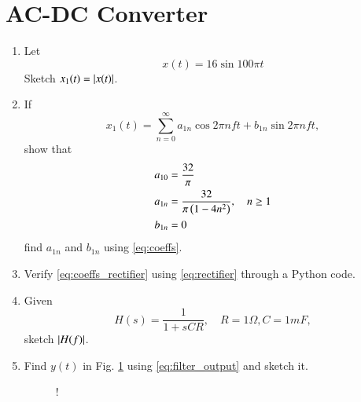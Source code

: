 \documentclass[journal,12pt,twocolumn]{IEEEtran}
\renewcommand\thesection{\arabic{section}}
\begin{document}
\section{AC-DC Converter}
\begin{enumerate}[label=\thesection.\arabic*
,ref=\thesection.\theenumi]
\item Let
\begin{equation}
x(t) = 16 \sin 100\pi t
\end{equation}
Sketch $x_1(t)=\left\vert x(t)\right\vert$.
\item If
\begin{equation}
\label{eq:rectifier}
x_1(t) = \sum_{n=0}^{\infty}a_{1n}\cos 2\pi n f t + b_{1n} \sin 2 \pi n f t,
\end{equation}
%
show that
\begin{align}
\label{eq:coeffs_rectifier}
a_{10} &= \frac{32}{\pi}
\\
a_{1n} &= \frac{32}{\pi\left(1-4n^2\right)}, \quad n \geq 1
\\
b_{1n} &=0
\end{align}
find $a_{1n}$ and $b_{1n}$ using \eqref{eq:coeffs}.
\item Verify \eqref{eq:coeffs_rectifier} using \eqref{eq:rectifier} through a Python 
code. 
\item Given
\begin{equation}
H(s)= \frac{1}{1+sCR}, \quad R = 1 \Omega, C =1 mF,
\end{equation}
sketch $\left\vert H(f)\right\vert$.
\item Find $y(t)$ in Fig. \ref{fig:filter} using  \eqref{eq:filter_output}  and sketch it.


\begin{figure}[!hb]
\centering
\resizebox {\columnwidth} {!} {
}
\caption{}
\label{fig:filter}
\end{figure}
\end{enumerate}
\end{document}
